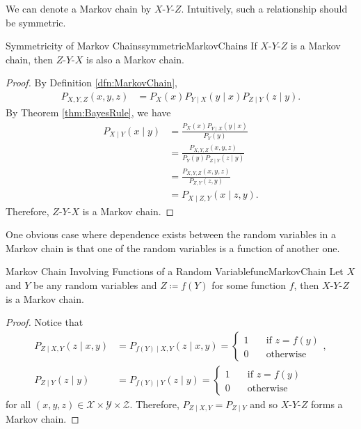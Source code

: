 \documentclass[math, code]{amznotes}
\theoremstyle{remark}
\begin{document}
We can denote a Markov chain by $X$-$Y$-$Z$. Intuitively, such a relationship should be symmetric.
\begin{probox}{Symmetricity of Markov Chains}{symmetricMarkovChains}
    If $X$-$Y$-$Z$ is a Markov chain, then $Z$-$Y$-$X$ is also a Markov chain.
    \tcblower
    \begin{proof}
        By Definition \ref{dfn:MarkovChain}, 
        \begin{align*}
            P_{X, Y, Z}\left(x, y, z\right) & = P_X\left(x\right)P_{Y \mid X}\left(y \mid x\right)P_{Z \mid Y}\left(z \mid y\right).
        \end{align*}
        By Theorem \ref{thm:BayesRule}, we have 
        \begin{align*}
            P_{X \mid Y}\left(x \mid y\right) & = \frac{P_X\left(x\right)P_{Y \mid X}\left(y \mid x\right)}{P_Y\left(y\right)} \\
            & = \frac{P_{X, Y, Z}\left(x, y, z\right)}{P_Y\left(y\right)P_{Z \mid Y}\left(z \mid y\right)} \\
            & = \frac{P_{X, Y, Z}\left(x, y, z\right)}{P_{Z, Y}\left(z, y\right)} \\
            & = P_{X \mid Z, Y}\left(x \mid z, y\right).
        \end{align*}
        Therefore, $Z$-$Y$-$X$ is a Markov chain.
    \end{proof}
\end{probox}
One obvious case where dependence exists between the random variables in a Markov chain is that one of the random variables is a function of another one.
\begin{probox}{Markov Chain Involving Functions of a Random Variable}{funcMarkovChain}
    Let $X$ and $Y$ be any random variables and $Z \coloneqq f\left(Y\right)$ for some function $f$, then $X$-$Y$-$Z$ is a Markov chain.
    \tcblower
    \begin{proof}
        Notice that 
        \begin{align*}
            P_{Z \mid X, Y}\left(z \mid x, y\right) & = P_{f\left(Y\right) \mid X, Y}\left(z \mid x, y\right) = \begin{cases}
                1 &\quad \textrm{if } z = f\left(y\right) \\
                0 &\quad \textrm{otherwise} 
            \end{cases}, \\
            P_{Z \mid Y}\left(z \mid y\right) & = P_{f\left(Y\right) \mid Y}\left(z \mid y\right) = \begin{cases}
                1 &\quad \textrm{if } z = f\left(y\right) \\
                0 &\quad \textrm{otherwise} 
            \end{cases}
        \end{align*}
        for all $\left(x, y, z\right) \in \mathcal{X} \times \mathcal{Y} \times \mathcal{Z}$. Therefore, $P_{Z \mid X, Y} = P_{Z \mid Y}$ and so $X$-$Y$-$Z$ forms a Markov chain.
    \end{proof}
\end{probox}
\end{document}
